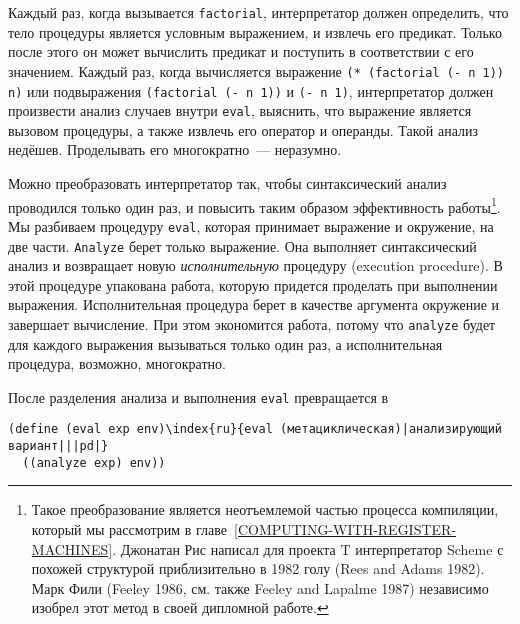 Каждый раз, когда вызывается {\tt factorial},
интерпретатор должен определить, что тело процедуры является условным
выражением, и извлечь его предикат.  Только после этого он может
вычислить предикат и поступить в соответствии с его значением.
Каждый раз, когда вычисляется выражение {\tt (* (factorial (- n 1))
n)} или подвыражения {\tt (factorial (- n 1))} и {\tt (-
n 1)}, интерпретатор должен произвести анализ случаев внутри
{\tt eval}, выяснить, что выражение является вызовом процедуры,
а также извлечь его оператор и операнды.  Такой анализ недёшев.
Проделывать его многократно~--- неразумно.\-


Можно преобразовать интерпретатор так, чтобы синтаксический
анализ проводился только один раз, и повысить таким образом
эффективность работы\footnote{Такое преобразование является неотъемлемой частью
процесса компиляции, который мы рассмотрим в 
главе~\ref{COMPUTING-WITH-REGISTER-MACHINES}.  Джонатан Рис
написал для проекта T интерпретатор Scheme с похожей структурой приблизительно в
1982 голу (Rees and Adams 1982).  Марк Фили 
(Feeley 1986, см. также 
Feeley and Lapalme 1987) независимо изобрел этот метод в
своей дипломной работе.}.
Мы разбиваем процедуру {\tt eval}, которая принимает выражение и
окружение, на две части.  {\tt Analyze} берет только
выражение.  Она выполняет синтаксический анализ и возвращает новую
{\em исполнительную} процедуру (execution 
procedure). 
В этой процедуре упакована работа, которую придется 
проделать при выполнении выражения.  Исполнительная процедура берет в
качестве аргумента окружение и завершает вычисление.  При этом
экономится работа, потому что {\tt analyze} будет для каждого
выражения вызываться только один раз, а исполнительная процедура,
возможно, многократно.

После разделения анализа и выполнения {\tt eval}
превращается в

\begin{Verbatim}[fontsize=\small]
(define (eval exp env)\index{ru}{eval (метациклическая)|анализирующий вариант|||pd|}
  ((analyze exp) env))
\end{Verbatim}

